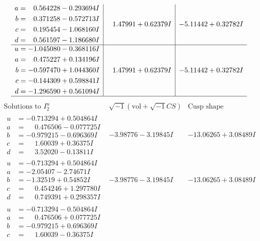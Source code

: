 \documentclass[1p]{elsarticle_modified}
\theoremstyle{definition}
\newcommand{\I}{\sqrt{-1}}
\begin{document}
$$\begin{array}{c|c|c}
\begin{aligned}
a &= \phantom{-}0.564228 - 0.293694 I \\
b &= \phantom{-}0.371258 - 0.572713 I \\
c &= \phantom{-}0.195454 - 1.068160 I \\
d &= \phantom{-}0.561597 - 1.186680 I\end{aligned}
 & \phantom{-}1.47991 + 0.62379 I & -5.11442 + 0.32782 I \\ \hline\begin{aligned}
u &= -1.045080 - 0.368116 I \\
a &= \phantom{-}0.475227 + 0.134196 I \\
b &= -0.597470 + 1.044360 I \\
c &= -0.144309 + 0.598841 I \\
d &= -1.296590 + 0.561094 I\end{aligned}
 & \phantom{-}1.47991 + 0.62379 I & -5.11442 + 0.32782 I\\
 \hline 
 \end{array}$$\newpage$$\begin{array}{c|c|c}  
\text{Solutions to }I^u_{2}& \I (\text{vol} + \sqrt{-1}CS) & \text{Cusp shape}\\
 \hline 
\begin{aligned}
u &= -0.713294 + 0.504864 I \\
a &= \phantom{-}0.476506 - 0.077725 I \\
b &= -0.979215 - 0.696369 I \\
c &= \phantom{-}1.60039 + 0.36375 I \\
d &= \phantom{-}3.52020 - 0.13811 I\end{aligned}
 & -3.98776 - 3.19845 I & -13.06265 + 3.08489 I \\ \hline\begin{aligned}
u &= -0.713294 + 0.504864 I \\
a &= -2.05407 - 2.74671 I \\
b &= -1.32519 + 0.54852 I \\
c &= \phantom{-}0.454246 + 1.297780 I \\
d &= \phantom{-}0.749391 + 0.298357 I\end{aligned}
 & -3.98776 - 3.19845 I & -13.06265 + 3.08489 I \\ \hline\begin{aligned}
u &= -0.713294 - 0.504864 I \\
a &= \phantom{-}0.476506 + 0.077725 I \\
b &= -0.979215 + 0.696369 I \\
c &= \phantom{-}1.60039 - 0.36375 I \\

\end{aligned}
\end{array}$$
\end{document}
